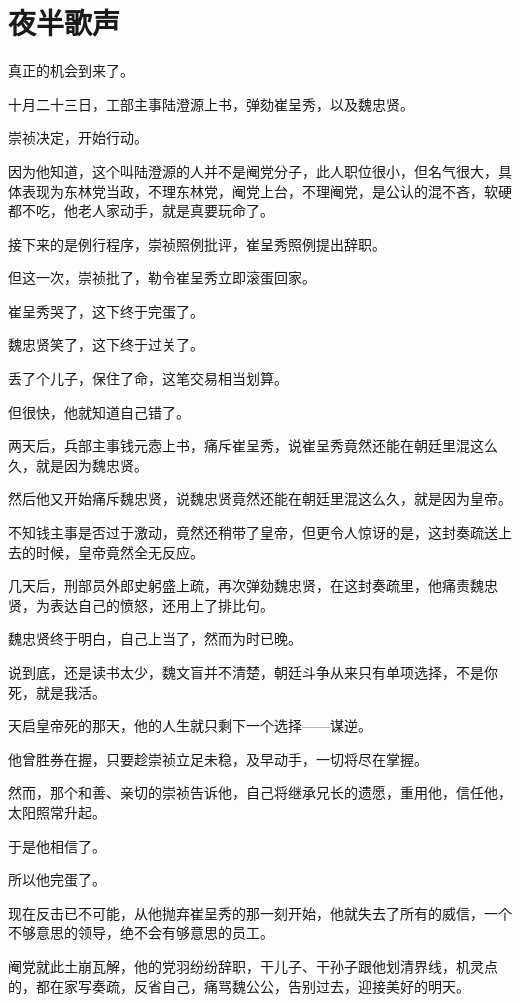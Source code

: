 \section{夜半歌声}
\ifnum{}
	\begin{multicols}{\theparacolNo}
\fi
真正的机会到来了。

十月二十三日，工部主事陆澄源上书，弹劾崔呈秀，以及魏忠贤。

崇祯决定，开始行动。

因为他知道，这个叫陆澄源的人并不是阉党分子，此人职位很小，但名气很大，具体表现为东林党当政，不理东林党，阉党上台，不理阉党，是公认的混不吝，软硬都不吃，他老人家动手，就是真要玩命了。

接下来的是例行程序，崇祯照例批评，崔呈秀照例提出辞职。

但这一次，崇祯批了，勒令崔呈秀立即滚蛋回家。

崔呈秀哭了，这下终于完蛋了。

魏忠贤笑了，这下终于过关了。

丢了个儿子，保住了命，这笔交易相当划算。

但很快，他就知道自己错了。

两天后，兵部主事钱元悫上书，痛斥崔呈秀，说崔呈秀竟然还能在朝廷里混这么久，就是因为魏忠贤。

然后他又开始痛斥魏忠贤，说魏忠贤竟然还能在朝廷里混这么久，就是因为皇帝。

不知钱主事是否过于激动，竟然还稍带了皇帝，但更令人惊讶的是，这封奏疏送上去的时候，皇帝竟然全无反应。

几天后，刑部员外郎史躬盛上疏，再次弹劾魏忠贤，在这封奏疏里，他痛责魏忠贤，为表达自己的愤怒，还用上了排比句。

魏忠贤终于明白，自己上当了，然而为时已晚。

说到底，还是读书太少，魏文盲并不清楚，朝廷斗争从来只有单项选择，不是你死，就是我活。

天启皇帝死的那天，他的人生就只剩下一个选择——谋逆。

他曾胜券在握，只要趁崇祯立足未稳，及早动手，一切将尽在掌握。

然而，那个和善、亲切的崇祯告诉他，自己将继承兄长的遗愿，重用他，信任他，太阳照常升起。

于是他相信了。

所以他完蛋了。

现在反击已不可能，从他抛弃崔呈秀的那一刻开始，他就失去了所有的威信，一个不够意思的领导，绝不会有够意思的员工。

阉党就此土崩瓦解，他的党羽纷纷辞职，干儿子、干孙子跟他划清界线，机灵点的，都在家写奏疏，反省自己，痛骂魏公公，告别过去，迎接美好的明天。


\end{multicols}
